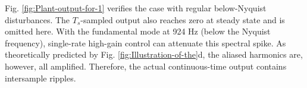 \documentclass [11pt, proquest] {uwthesis}[2020/02/24]
\begin{document}
Fig. \ref{fig:Plant-output-for-1} verifies the case with regular
below-Nyquist disturbances. The $T_{s}$-sampled output also reaches
zero at steady state and is omitted here. With the fundamental mode
at 924 Hz (below the Nyquist frequency), single-rate high-gain control
can attenuate this spectral spike. As theoretically predicted by Fig.
\ref{fig:Illustration-of-the}d, the aliased harmonics are, however,
all amplified. Therefore, the actual continuous-time output contains
intersample ripples.
\begin{figure}[!ht]
\begin{centering}
\par\end{centering}

\end{figure}
\end{document}
